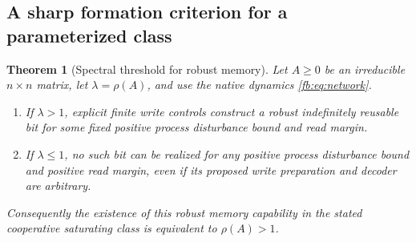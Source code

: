 \documentclass[11pt]{article}
\newtheorem{theorem}{Theorem}[section]
\theoremstyle{definition}
\theoremstyle{remark}
\begin{document}
\subsection{A sharp formation criterion for a parameterized class}
\begin{theorem}[Spectral threshold for robust memory]\label{fb:thm:threshold}
Let $A\geq0$ be an irreducible $n\times n$ matrix, let $\lambda=\rho(A)$, and use the native dynamics \eqref{fb:eq:network}.
\begin{enumerate}
\item If $\lambda>1$, explicit finite write controls construct a robust indefinitely reusable bit for some fixed positive process disturbance bound and read margin.
\item If $\lambda\leq1$, no such bit can be realized for any positive process disturbance bound and positive read margin, even if its proposed write preparation and decoder are arbitrary.
\end{enumerate}
Consequently the existence of this robust memory capability in the stated cooperative saturating class is equivalent to $\rho(A)>1$.
\end{theorem}
\end{document}
